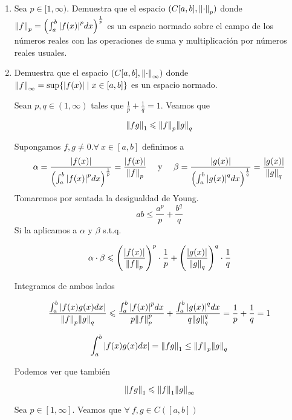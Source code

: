 \documentclass[12pt]{article}
\begin{document}
\begin{enumerate}[label=\textbf{\arabic*}.]

\item Sea $p \in [1,\infty)$. Demuestra que el espacio $(C[a,b],{\norm{\cdot}}_{p})$ donde ${\norm{f}}_{p} = {\left( \int_{a}^{b} {\abs{f(x)}}^{p} dx \right)}^{\frac{1}{p}}$ es un espacio normado sobre el campo de los números reales con las operaciones de suma y multiplicación por números reales usuales.

\item Demuestra que el espacio $(C[a,b],{\norm{\cdot}}_{\infty})$ donde ${\norm{f}}_{\infty} = \sup \{ \abs{f(x)} \mid x \in [a,b] \}$ es un espacio normado.

\begin{lema}
    Sean $p,q \in (1,\infty)$ tales que $\frac{1}{p} + \frac{1}{q} = 1$. Veamos que
    
    $$ \norm{fg}_1 \leqslant \norm{f}_p \norm{g}_q$$
    
    Supongamos $f,g \neq 0. \forall \: x \in [a,b]$ definimos a 
    \begin{align*}
       \alpha = \frac{\abs{f(x)}}{{\left( \int_{a}^{b} {\abs{f(x)}}^{p} dx \right)}^{\frac{1}{p}}} = \frac{\abs{f(x)}}{\norm{f}_p} && \text{ y } && \beta = \frac{\abs{g(x)}}{{\left( \int_{a}^{b} {\abs{g(x)}}^{q} dx \right)}^{\frac{1}{q}}} = \frac{\abs{g(x)}}{\norm{g}_q}
    \end{align*}
    Tomaremos por sentada la desigualdad de Young. $$ab \leqslant \frac{a^p}{p} + \frac{b^q}{q}$$ Si la aplicamos a $\alpha$ y $\beta$ s.t.q.

    $$\alpha \cdot \beta \leqslant \left( \frac{\abs{f(x)}}{\norm{f}_p} \right)^p \cdot \frac{1}{p} + \left( \frac{\abs{g(x)}}{\norm{g}_q} \right)^q \cdot \frac{1}{q}$$

    Integramos de ambos lados

    $$\frac{\int_{a}^{b}\abs{f(x)g(x)dx}}{\norm{f}_p \norm{g}_q} \leqslant \frac{\int_{a}^{b}{\abs{f(x)}}^{p}dx}{p{\norm{f}}^{p}_{p}}+\frac{\int_{a}^{b}{\abs{g(x)}}^{q}dx}{q{\norm{g}}^{q}_{q}} = \frac{1}{p} + \frac{1}{q} = 1$$

    $$\int_{a}^{b}\abs{f(x)g(x)dx} = \norm{fg}_1 \leq \norm{f}_p \norm{g}_q$$

    Podemos ver que también

    $$\norm{fg}_1 \leqslant \norm{f}_1 \norm{g}_\infty$$
\end{lema}

\begin{lema}
    Sea $p\in [1,\infty]$. Veamos que $\forall \: f,g \in C([a,b])$


\end{lema}
\end{enumerate}
\end{document}
